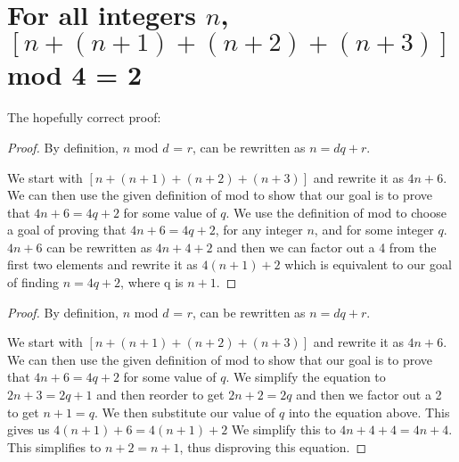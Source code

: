 \documentclass[12pt]{article}
\begin{document}
\section*{For all integers $n$,$[n+(n+1)+(n+2)+(n+3)]$ mod 4 = 2}
The hopefully correct proof:
\begin{proof} %
By definition, $n$ mod $d$ = $r$, can be rewritten as $n = dq + r$.

We start with $[n+(n+1)+(n+2)+(n+3)]$ and rewrite it as $4n+6$.
We can then use the given definition of mod to show that our goal is
to prove that $4n + 6 = 4q+2$ for some value of $q$.
We use the definition of mod to choose a goal of proving that $4n+6 =
4q + 2$, for any integer $n$, and for some integer $q$.
$4n + 6$ can be rewritten as $4n + 4 + 2$ and then we can factor out a
4 from the first two elements and rewrite it as $4(n + 1) + 2$ which
is equivalent to our goal of finding $n = 4q + 2$, where q is $n + 1$.

\end{proof}
\begin{proof} %
By definition, $n$ mod $d$ = $r$, can be rewritten as $n = dq + r$.

We start with $[n+(n+1)+(n+2)+(n+3)]$ and rewrite it as $4n+6$.
We can then use the given definition of mod to show that our goal is
to prove that $4n + 6 = 4q+2$ for some value of $q$.
We simplify the equation to $2n + 3 = 2q + 1$ and then reorder to get
$2n + 2 = 2q$ and then we factor out a 2 to get $n + 1 = q$. We then substitute our value of
$q$ into the equation above. This gives us $4(n +1) +6 = 4(n+1) + 2$
We simplify this to $4n + 4 + 4 = 4n + 4$.
This simplifies to $n + 2 = n + 1$, thus disproving this equation.
\end{proof}
\end{document}
